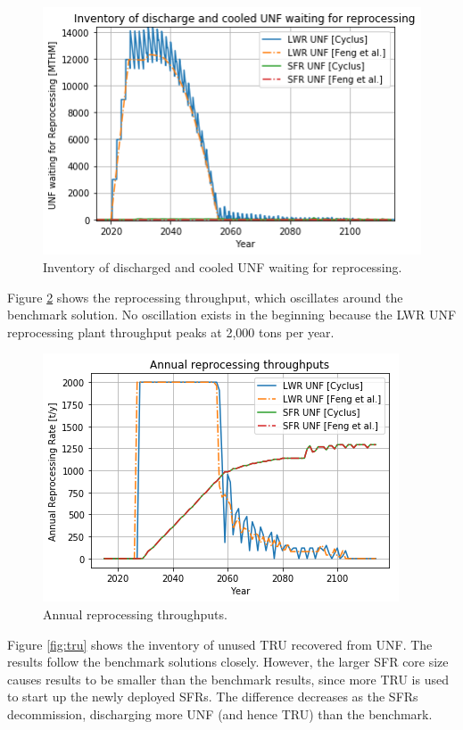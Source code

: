\begin{figure}[htbp!]
	\begin{center}
		\includegraphics[scale=0.5]{./images/results_18/waiting_monthly.png}
	\end{center}
	\caption{Inventory of discharged and cooled \gls{UNF} waiting for reprocessing.}
	\label{fig:waiting_monthly}
\end{figure}


Figure \ref{fig:rep} shows the reprocessing throughput, which oscillates around
the benchmark solution. No oscillation exists in the beginning because the
\gls{LWR} \gls{UNF} reprocessing plant throughput peaks at 2,000 tons per year.

\begin{figure}[htbp!]
	\begin{center}
		\includegraphics[scale=0.5]{./images/results_18/rep.png}
	\end{center}
	\caption{Annual reprocessing throughputs.}
	\label{fig:rep}
\end{figure}


Figure \ref{fig:tru} shows the inventory of unused \gls{TRU} recovered from \gls{UNF}.
The \Cyclus results follow the benchmark solutions closely. However,
the larger \gls{SFR} core size causes \Cyclus results to be smaller than the benchmark results,
since more \gls{TRU} is used to
start up the newly deployed \glspl{SFR}. The difference decreases as the
\glspl{SFR} decommission, discharging more \gls{UNF} (and hence \gls{TRU}) than
the benchmark.


